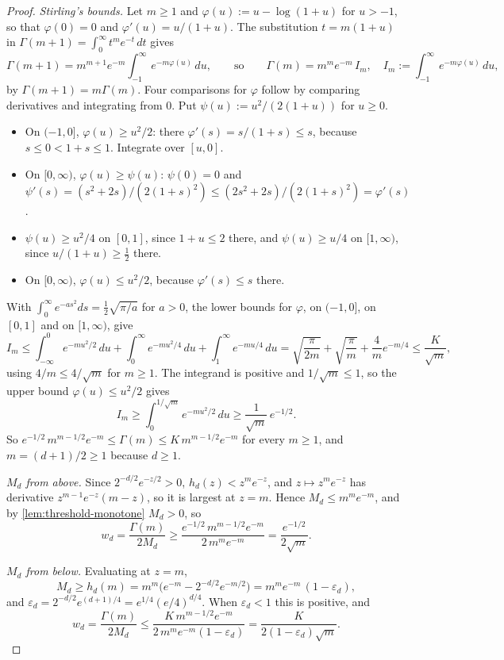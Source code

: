 \begin{proof}
\leanok
\emph{Stirling's bounds.} Let $m \ge 1$ and $\varphi(u) := u - \log(1+u)$ for $u > -1$, so that
$\varphi(0) = 0$ and $\varphi'(u) = u/(1+u)$. The substitution $t = m(1+u)$ in
$\Gamma(m+1) = \int_0^\infty t^m e^{-t}\,dt$ gives
\[
  \Gamma(m+1) = m^{m+1}e^{-m}\int_{-1}^\infty e^{-m\varphi(u)}\,du ,
  \qquad\text{so}\qquad
  \Gamma(m) = m^m e^{-m}\,I_m ,\quad I_m := \int_{-1}^\infty e^{-m\varphi(u)}\,du ,
\]
by $\Gamma(m+1) = m\Gamma(m)$. Four comparisons for $\varphi$ follow by comparing derivatives and
integrating from $0$. Put $\psi(u) := u^2/(2(1+u))$ for $u \ge 0$.
\begin{itemize}
\item On $(-1,0]$, $\varphi(u) \ge u^2/2$: there $\varphi'(s) = s/(1+s) \le s$, because
$s \le 0 < 1+s \le 1$. Integrate over $[u,0]$.
\item On $[0,\infty)$, $\varphi(u) \ge \psi(u)$: $\psi(0) = 0$ and
$\psi'(s) = (s^2+2s)/(2(1+s)^2) \le (2s^2+2s)/(2(1+s)^2) = \varphi'(s)$.
\item $\psi(u) \ge u^2/4$ on $[0,1]$, since $1+u \le 2$ there, and $\psi(u) \ge u/4$ on
$[1,\infty)$, since $u/(1+u) \ge \tfrac12$ there.
\item On $[0,\infty)$, $\varphi(u) \le u^2/2$, because $\varphi'(s) \le s$ there.
\end{itemize}
With $\int_0^\infty e^{-as^2}ds = \tfrac12\sqrt{\pi/a}$ for $a > 0$, the lower bounds for
$\varphi$, on $(-1,0]$, on $[0,1]$ and on $[1,\infty)$, give
\[
  I_m \le \int_{-\infty}^0 e^{-mu^2/2}\,du + \int_0^\infty e^{-mu^2/4}\,du
   + \int_1^\infty e^{-mu/4}\,du
  = \sqrt{\frac{\pi}{2m}} + \sqrt{\frac{\pi}{m}} + \frac4m e^{-m/4}
  \le \frac{K}{\sqrt m} ,
\]
using $4/m \le 4/\sqrt m$ for $m \ge 1$. The integrand is positive and $1/\sqrt m \le 1$, so the
upper bound $\varphi(u) \le u^2/2$ gives
\[
  I_m \ge \int_0^{1/\sqrt m} e^{-mu^2/2}\,du \ge \frac{1}{\sqrt m}\,e^{-1/2} .
\]
So $e^{-1/2}\,m^{m-1/2}e^{-m} \le \Gamma(m) \le K\,m^{m-1/2}e^{-m}$ for every $m \ge 1$, and
$m = (d+1)/2 \ge 1$ because $d \ge 1$.

\emph{$M_d$ from above.} Since $2^{-d/2}e^{-z/2} > 0$, $h_d(z) < z^m e^{-z}$, and
$z \mapsto z^m e^{-z}$ has derivative $z^{m-1}e^{-z}(m - z)$, so it is largest at $z = m$. Hence
$M_d \le m^m e^{-m}$, and by \ref{lem:threshold-monotone} $M_d > 0$, so
\[
  w_d = \frac{\Gamma(m)}{2M_d} \ge \frac{e^{-1/2}\,m^{m-1/2}e^{-m}}{2\,m^m e^{-m}}
   = \frac{e^{-1/2}}{2\sqrt m} .
\]

\emph{$M_d$ from below.} Evaluating at $z = m$,
\[
  M_d \ge h_d(m) = m^m\bigl(e^{-m} - 2^{-d/2}e^{-m/2}\bigr) = m^m e^{-m}\,(1 - \varepsilon_d) ,
\]
and $\varepsilon_d = 2^{-d/2}e^{(d+1)/4} = e^{1/4}(e/4)^{d/4}$. When $\varepsilon_d < 1$ this is
positive, and
\[
  w_d = \frac{\Gamma(m)}{2M_d} \le \frac{K\,m^{m-1/2}e^{-m}}{2\,m^m e^{-m}(1-\varepsilon_d)}
   = \frac{K}{2(1-\varepsilon_d)\sqrt m} .
\]


\end{proof}

